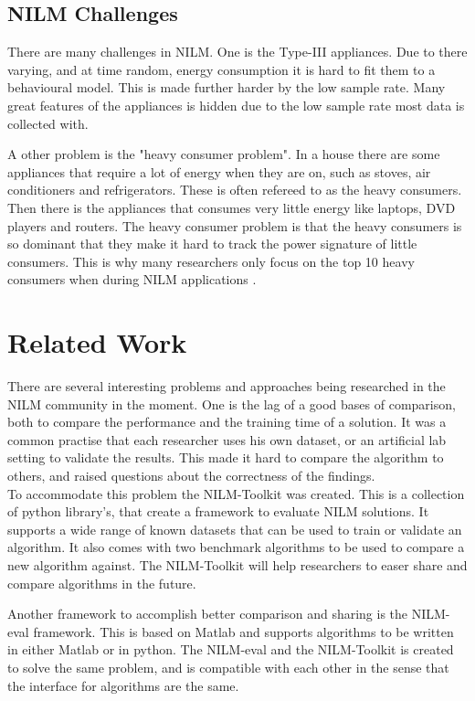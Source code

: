 \subsection{NILM Challenges} 
There are many challenges in NILM. One is the Type-III appliances. Due to there varying, and at time random, energy consumption it is hard to fit them to a behavioural model. This is made further harder by the low sample rate. Many great features of the appliances is hidden due to the low sample rate most data is collected with\citep{RefWorks:17}.

A other problem is the "heavy consumer problem". In a house there are some appliances that require a lot of energy when they are on, such as stoves, air conditioners and refrigerators. These is often refereed to as the heavy consumers. Then there is the appliances that consumes very little energy like laptops, DVD players and routers. The heavy consumer problem is that the heavy consumers is so dominant that they make it hard to track the power signature of little consumers. This is why many researchers only focus on the top 10 heavy consumers when during NILM applications \citep{RefWorks:21}. 

\section{Related Work} 
\label{sec:RecRelatedwork}

There are several interesting problems and approaches being researched in the NILM community in the moment. One is the lag of a good bases of comparison, both to compare the performance and the training time of a solution. It was a common practise that each researcher uses his own dataset, or an artificial lab setting to validate the results. This made it hard to compare the algorithm to others, and raised questions about the correctness of the findings. \\
To accommodate this problem the NILM-Toolkit was created. This is a collection of python library's, that create a framework to evaluate NILM solutions. It supports a wide range of known datasets that can be used to train or validate an algorithm. It also comes with two benchmark algorithms to be used to compare a new algorithm against. The NILM-Toolkit will help researchers to easer share and compare algorithms in the future\citep{RefWorks:21}. 

Another framework to accomplish better comparison and sharing is the NILM-eval framework. This is based on Matlab and supports algorithms to be written in either Matlab or in python. The NILM-eval and the NILM-Toolkit is created to solve the same problem, and is compatible with each other in the sense that the interface for algorithms are the same\citep{RefWorks:26}. 


